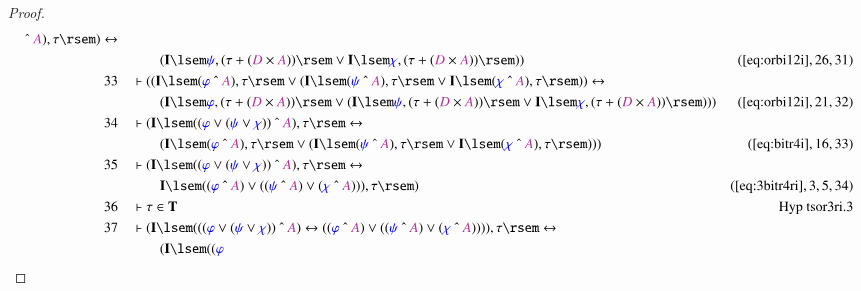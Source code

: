 \begin{proof}
\begin{align}
      ~\string^~ \mc{A} ) , \tau \rsem ) \leftrightarrow  \notag \\ & & & \qquad
     (
      \mathbf{I} \lsem \mw{\psi} , ( \tau + ( \mc{D} \times
      \mc{A} ) ) \rsem \vee \mathbf{I} \lsem \mw{\chi} , (
      \tau + ( \mc{D} \times \mc{A} ) ) \rsem )
      )&(\mbox{\ref{eq:orbi12i}},26,31)\notag
  \\ 33 &&  & \vdash ( ( \mathbf{I} \lsem ( \mw{\varphi} ~\string^~ \mc{A} ) ,
      \tau \rsem \vee ( \mathbf{I} \lsem ( \mw{\psi}
      ~\string^~ \mc{A} ) , \tau \rsem \vee \mathbf{I}
      \lsem ( \mw{\chi} ~\string^~ \mc{A} ) , \tau \rsem )
      ) \leftrightarrow  \notag \\ & & & \qquad
     ( \mathbf{I} \lsem \mw{\varphi} , (
      \tau + ( \mc{D} \times \mc{A} ) ) \rsem \vee (
      \mathbf{I} \lsem \mw{\psi} , ( \tau + ( \mc{D} \times
      \mc{A} ) ) \rsem \vee \mathbf{I} \lsem \mw{\chi} , (
      \tau + ( \mc{D} \times \mc{A} ) ) \rsem ) )
      )&(\mbox{\ref{eq:orbi12i}},21,32)\notag
  \\ 34 &&  & \vdash ( \mathbf{I} \lsem ( ( \mw{\varphi} \vee ( \mw{\psi} \vee
      \mw{\chi} ) ) ~\string^~ \mc{A} ) , \tau \rsem
      \leftrightarrow  \notag \\ & & & \qquad
     ( \mathbf{I} \lsem ( \mw{\varphi}
      ~\string^~ \mc{A} ) , \tau \rsem \vee ( \mathbf{I}
      \lsem ( \mw{\psi} ~\string^~ \mc{A} ) , \tau \rsem
      \vee \mathbf{I} \lsem ( \mw{\chi} ~\string^~ \mc{A} )
      , \tau \rsem ) )
      )&(\mbox{\ref{eq:bitr4i}},16,33)\notag
  \\ 35 &&  & \vdash ( \mathbf{I} \lsem ( ( \mw{\varphi} \vee ( \mw{\psi} \vee
      \mw{\chi} ) ) ~\string^~ \mc{A} ) , \tau \rsem
      \leftrightarrow  \notag \\ & & & \qquad
     \mathbf{I} \lsem ( ( \mw{\varphi}
      ~\string^~ \mc{A} ) \vee ( ( \mw{\psi} ~\string^~
      \mc{A} ) \vee ( \mw{\chi} ~\string^~ \mc{A} ) ) ) ,
      \tau \rsem )&(\mbox{\ref{eq:3bitr4ri}},3,5,34)\notag
  \\ 36 &&  & \vdash \tau \in
      \mathbf{T}&\text{Hyp~tsor3ri.3}\notag%
  \\ 37 &&  & \vdash ( \mathbf{I} \lsem ( ( ( \mw{\varphi} \vee ( \mw{\psi}
      \vee \mw{\chi} ) ) ~\string^~ \mc{A} )
      \leftrightarrow ( ( \mw{\varphi} ~\string^~ \mc{A} )
      \vee ( ( \mw{\psi} ~\string^~ \mc{A} ) \vee (
      \mw{\chi} ~\string^~ \mc{A} ) ) ) ) , \tau \rsem
      \leftrightarrow  \notag \\ & & & \qquad
     ( \mathbf{I} \lsem ( ( \mw{\varphi}

\end{align}
\end{proof}
